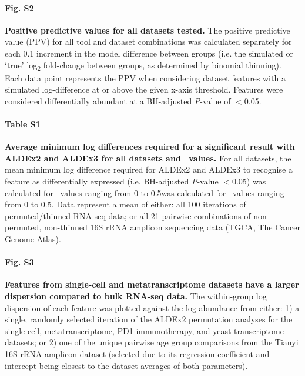\documentclass[10pt,letterpaper]{article}
\begin{document}
\paragraph*{Fig. S2}
\label{fig:supFigPPV}
\textbf{Positive predictive values for all datasets tested.} The positive predictive value (PPV) for all tool and dataset combinations was calculated separately for each 0.1 increment in the model difference between groups (i.e. the simulated or `true' log\textsubscript{2} fold-change between groups, as determined by binomial thinning). Each data point represents the PPV when considering dataset features with a simulated log-difference at or above the given x-axis threshold. Features were considered differentially abundant at a BH-adjusted \textit{P}-value of $<$0.05.

\paragraph*{Table S1}
\label{tab:supTabDensity}
\textbf{Average minimum log differences required for a significant result with ALDEx2 and ALDEx3 for all datasets and \textgamma~values.} For all datasets, the mean minimum log difference required for ALDEx2 and ALDEx3 to recognise a feature as differentially expressed (i.e. BH-adjusted \textit{P}-value $<$0.05) was calculated for \textgamma~values ranging from 0 to 0.5was calculated for \textgamma~values ranging from 0 to 0.5. Data represent a mean of either: all 100 iterations of permuted/thinned RNA-seq data; or all 21 pairwise combinations of non-permuted, non-thinned 16S rRNA amplicon sequencing data (TGCA, The Cancer Genome Atlas).

\paragraph*{Fig. S3}
\label{fig:supFigDispAbund}
\textbf{Features from single-cell and metatranscriptome datasets have a larger dispersion compared to bulk RNA-seq data.} The within-group log dispersion of each feature was plotted against the log abundance from either: 1) a single, randomly selected iteration of the ALDEx2 permutation analyses for the single-cell, metatranscriptome, PD1 immunotherapy, and yeast transcriptome datasets; or 2) one of the unique pairwise age group comparisons from the Tianyi 16S rRNA amplicon dataset (selected due to its regression coefficient and intercept being closest to the dataset averages of both parameters).
\end{document}
